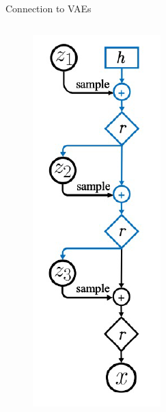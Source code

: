 \begin{frame}{Connection to VAEs}
\begin{columns}
    \begin{column}{0.3\textwidth}
    \begin{figure}
        \centering
        \includegraphics[height=0.8\textheight, width=\textwidth, keepaspectratio]{images/diffusion/diff_8.png}
    \end{figure}
    \end{column}
\end{columns}
\end{frame}
